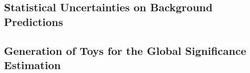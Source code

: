\subsection{Statistical Uncertainties on Background Predictions}%
\label{app:barlow_beeston}



\clearpage
\subsection{Generation of Toys for the Global Significance Estimation}%
\label{app:toy_generation}



